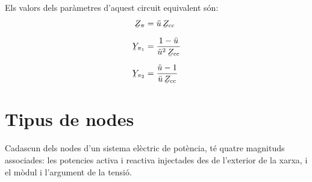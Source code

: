 Els valors dels par\`{a}metres d'aquest circuit equivalent s\'{o}n:
\begin{align}
   \cmplx{Z}_\pi &= \ddot{u} \, \cmplx{Z}\ped{cc} \\[1.5ex]
   \cmplx{Y}_{\pi_1} &= \frac{1-\ddot{u}}{\ddot{u}^2 \,\cmplx{Z}\ped{cc}} \\[1.5ex]
   \cmplx{Y}_{\pi_2} &= \frac{\ddot{u}-1}{\ddot{u}\, \cmplx{Z}\ped{cc}}
\end{align}

\section{Tipus de nodes} 

Cadascun dels nodes d'un sistema el\`{e}ctric de pot\`{e}ncia, t\'{e} quatre magnituds associades: les
potencies activa i reactiva injectades des de l'exterior de la xarxa, i el m\`{o}dul i
l'argument de la tensi\'{o}.

